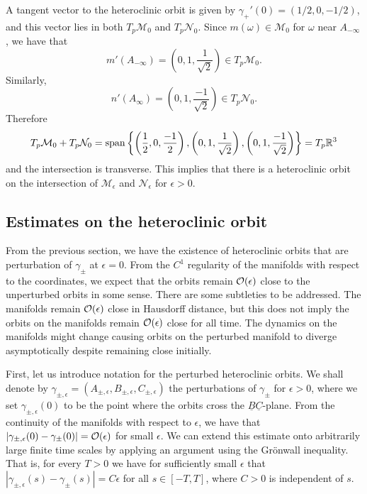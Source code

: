 A tangent vector to the heteroclinic orbit is given by \(\gamma_{+}'(0) = (1/2, 0, -1/2)\), and this vector lies in both \(T_p\mathcal M_0\) and \(T_p \mathcal N_0\). Since \(m(\omega) \in \mathcal M_0\) for \(\omega\) near \(A_{-\infty}\), we have that 
\begin{equation}
	m'(A_{-\infty}) = \left( 0, 1, \frac  1 {\sqrt 2} \right) \in T_p \mathcal M_0.
\end{equation}
Similarly,
\begin{equation}
	n'(A_{\infty}) = \left( 0, 1, \frac  {-1} {\sqrt 2} \right) \in T_p \mathcal N_0.
\end{equation}
Therefore
\begin{equation}
	T_p \mathcal M_0 + T_p \mathcal N_0 = \mathrm{span} \left\{ \left(\frac 1 2 , 0, \frac{-1} 2\right),  \left( 0, 1, \frac  1 {\sqrt 2} \right) ,  \left( 0, 1, \frac  {-1} {\sqrt 2} \right) \right\} = T_p\mathbb{R}^3
\end{equation}
and the intersection is transverse. This implies that there is a heteroclinic orbit on the intersection of \(\mathcal M_\epsilon\) and \(\mathcal N_\epsilon\) for \(\epsilon > 0\). 

\subsection{Estimates on the heteroclinic orbit}

From the previous section, we have the existence of heteroclinic orbits that are perturbation of \(\gamma_\pm\) at \(\epsilon = 0\). From the \(C^1\) regularity of the manifolds with respect to the coordinates, we expect that the orbits remain \(\mathcal{O}(\epsilon)\) close to the unperturbed orbits in some sense. There are some subtleties to be addressed. The manifolds remain \(\mathcal{O}(\epsilon)\) close in Hausdorff distance, but this does not imply the orbits on the manifolds remain \(\mathcal{O}(\epsilon)\) close for all time. The dynamics on the manifolds might change causing orbits on the perturbed manifold to diverge asymptotically despite remaining close initially.

First, let us introduce notation for the perturbed heteroclinic orbits. We shall denote by \(\gamma_{\pm, \epsilon} = (A_{\pm, \epsilon} , B_{\pm, \epsilon}, C_{\pm,\epsilon})\) the perturbations of \(\gamma_{\pm}\) for \(\epsilon > 0\), where we set \(\gamma_{\pm,\epsilon}(0)\) to be the point where the orbits cross the \(\underline{B}\underline{C}\)-plane. From the continuity of the manifolds with respect to \(\epsilon\), we have that \(|\gamma_{\pm, \epsilon}(0) - \gamma_\pm(0)| = \mathcal{O}(\epsilon)\) for small \(\epsilon\). We can extend this estimate onto arbitrarily large finite time scales by applying an argument using the Gr\"onwall inequality. That is, for every \(T> 0\) we have for sufficiently small \(\epsilon\) that \(|\gamma_{\pm, \epsilon}(s) - \gamma_\pm(s)| = C\epsilon\) for all \(s\in[-T,T]\), where \(C>0\) is independent of \(s\). 

